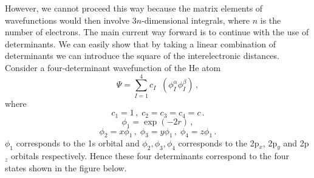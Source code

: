 \documentclass{article}
\theoremstyle{plain}\theoremheaderfont{\normalfont\itshape}\theorembodyfont{\rmfamily}\theoremseparator{.}\newtheorem*{rem}{Remark}\newtheorem*{ex}{Example}\newtheorem*{proof}{Proof}\newtheorem*{altp}{Alternative proof}
\theoremstyle{plain}\theoremheaderfont{\normalfont\bfseries}\theorembodyfont{\rmfamily}\theoremseparator{.}\newtheorem{thm}{Theorem}[section]\newtheorem{lem}[thm]{Lemma}\newtheorem{prop}[thm]{Proposition}\newtheorem*{cor}{Corollary}\newtheorem{defn}[thm]{Definition}\newtheorem{clm}[thm]{Claim}\newtheorem{clminproof}{Claim}
\theoremstyle{break}\theoremheaderfont{\normalfont\itshape}\theorembodyfont{\rmfamily}\theoremseparator{.\medskip}\newtheorem*{proofskip}{Proof}\newtheorem*{exs}{Examples}\newtheorem*{rems}{Remarks}
\theoremstyle{break}\theoremheaderfont{\normalfont\bfseries}\theorembodyfont{\rmfamily}\theoremseparator{.\medskip}\newtheorem{lemskip}[thm]{Lemma}\newtheorem{defnskip}[thm]{Definition}\newtheorem{propskip}[thm]{Proposition}\newtheorem{thmskip}[thm]{Theorem}
\numberwithin{equation}{section}
\DeclareMathOperator{\antisymm}{\hat{\mathcal{A}}}
\newcommand{\x}{_{\text{x}}}
\begin{document}
    However, we cannot proceed this way because the matrix elements of wavefunctions would then involve \(3n\)-dimensional integrals, where \(n\) is the number of electrons. The main current way forward is to continue with the use of determinants. We can easily show that by taking a linear combination of determinants we can introduce the square of the interelectronic distances. Consider a four-determinant wavefunction of the He atom
    \begin{equation}
        \Psi=\sum_{I=1}^{4}c_I\antisymm(\phi_I^\alpha\phi_I^\beta)\,,
    \end{equation}
    where
    \begin{equation}
        c_1=1\,,\; c_2=c_3=c_4=c\,.
    \end{equation}
    \begin{equation}
        \phi_1=\exp(-2r)\,,
    \end{equation}
    \begin{equation}
        \phi_2=x\phi_1\,,\;\phi_3=y\phi_1\,,\;\phi_4=z\phi_1\,.
    \end{equation}
    \(\phi_1\) corresponds to the 1s orbital and \(\phi_2,\phi_3,\phi_4\) corresponds to the 2p\(_x\), 2p\(_y\) and 2p\(_z\) orbitals respectively. Hence these four determinants correspond to the four states shown in the figure below.

    \begin{figure}[ht!]
        \centering
    \end{figure}
\end{document}
